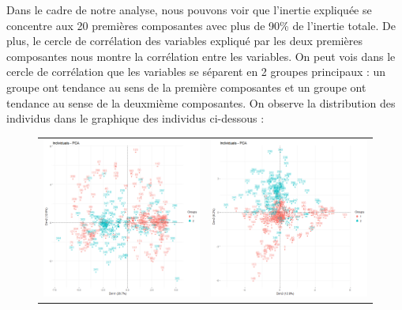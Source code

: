 \documentclass[a4paper,11pt,oneside,roman]{article}
\begin{document}
Dans le cadre de notre analyse, nous pouvons voir que l'inertie expliquée se concentre aux 20 premières composantes avec plus de 90\% de l'inertie totale. De plus, le cercle de corrélation des variables expliqué par les deux premières composantes nous montre la corrélation entre les variables. On peut vois dans le cercle de corrélation que les variables se séparent en 2 groupes principaux : un groupe ont tendance  au sens de la première composantes et un groupe ont tendance au sense de la deuxmième composantes. On observe la distribution des individus dans le graphique des individus ci-dessous : 
\begin{figure}[htb]
    \centering
    \begin{tabular}{cc}
    \includegraphics[scale = .3]{./discrimination/ionosphere/indi_plot12.png} &
    \includegraphics[scale = .3]{./discrimination/ionosphere/indi_plot23.png} 

\end{tabular}
\end{figure}
\end{document}
